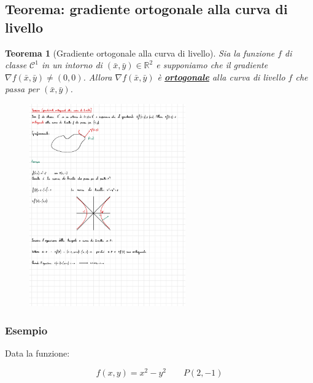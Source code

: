 \documentclass[a4paper]{article}
\newtheorem{theorem}{Teorema}
\begin{document}
	\subsection{Teorema: gradiente ortogonale alla curva di livello}
	
	\begin{theorem}[Gradiente ortogonale alla curva di livello]
		Sia la funzione $f$ di classe $\mathcal{C}^{1}$ in un intorno di $\left(\bar{x},\bar{y}\right) \in \mathbb{R}^{2}$ e supponiamo che il gradiente $\nabla f\left(\bar{x}, \bar{y}\right) \ne \left(0,0\right)$. Allora $\nabla f\left(\bar{x},\bar{y}\right)$ è \textcolor{Red3}{\textbf{\underline{ortogonale}}} alla curva di livello $f$ che passa per $\left(\bar{x},\bar{y}\right)$.
		
		\begin{figure}[!htp]
			\centering
			\includegraphics[width=0.6\textwidth]{img/teorema_gradiente_ortogonale.pdf}
		\end{figure}
	\end{theorem}

	\subsubsection[Esempio]{\textcolor{Green4}{Esempio}}
	
	Data la funzione:
	
	\begin{equation*}
		f\left(x,y\right) = x^{2} - y^{2} \hspace{2em} P\left(2, -1\right)
	\end{equation*}
\end{document}
